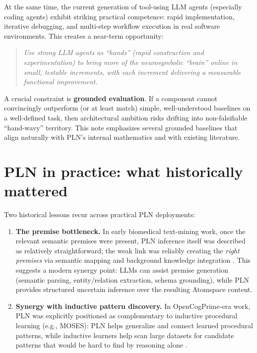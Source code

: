 \documentclass[11pt]{article}
\begin{document}
At the same time, the current generation of tool-using LLM agents (especially coding agents)
exhibit striking practical competence: rapid implementation, iterative debugging, and multi-step
workflow execution in real software environments.
This creates a near-term opportunity:

\begin{quote}
\emph{Use strong LLM agents as ``hands'' (rapid construction and experimentation) to bring more of
the neurosymbolic ``brain'' online in small, testable increments, with each increment delivering a
measurable functional improvement.}
\end{quote}

A crucial constraint is \textbf{grounded evaluation}.
If a component cannot convincingly outperform (or at least match) simple, well-understood
baselines on a well-defined task, then architectural ambition risks drifting into non-falsifiable
``hand-wavy'' territory. This note emphasizes several grounded baselines that align naturally with
PLN's internal mathematics and with existing literature.

\section{PLN in practice: what historically mattered}

Two historical lessons recur across practical PLN deployments:

\begin{enumerate}[leftmargin=*]
\item \textbf{The premise bottleneck.}
In early biomedical text-mining work, once the relevant semantic premises were present,
PLN inference itself was described as relatively straightforward; the weak link was reliably
creating the \emph{right premises} via semantic mapping and background knowledge integration
\cite{bioliterate-2006}.
This suggests a modern synergy point: LLMs can assist premise generation (semantic parsing,
entity/relation extraction, schema grounding), while PLN provides structured uncertain inference
over the resulting Atomspace content.

\item \textbf{Synergy with inductive pattern discovery.}
In OpenCogPrime-era work, PLN was explicitly positioned as complementary to inductive
procedural learning (e.g., MOSES): PLN helps generalize and connect learned procedural patterns,
while inductive learners help scan large datasets for candidate patterns that would be hard to find
by reasoning alone \cite{agi15-synergy}.
\end{enumerate}
\end{document}
